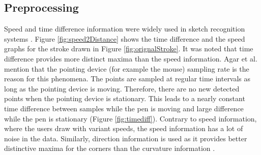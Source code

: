 \documentclass{article}
\begin{document}
\subsection{Preprocessing}
\label{Prepross}%
 Speed and time difference information were widely used in sketch recognition systems \cite{earlyprocess}. Figure \ref{fig:speed2Distance} shows the time difference and the speed graphs for the stroke drawn in Figure \ref{fig:orignalStroke}. It was noted that time difference provides more distinct maxima than the speed information. Agar et al. \cite{polygonfeedback31} mention that the pointing device (for example the mouse) sampling rate is the reason for this phenomena. The points are sampled at regular time intervals as long as the pointing device is moving. Therefore, there are no new detected points when the pointing device is stationary. This leads to a nearly constant time difference between samples while the pen is moving and large difference while the pen is stationary (Figure \ref{fig:timediff}). Contrary to speed information, where the users draw with variant speeds, the speed information has a lot of noise in the data.  Similarly, direction information is used as it provides better distinctive maxima for the corners than the curvature information \cite{meanshift10}.%
\end{document}

